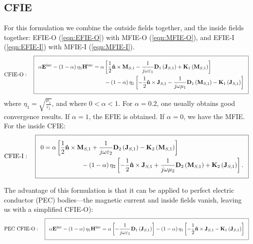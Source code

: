 \documentclass[a4paper,10pt]{book}
\newcommand{\field}[1]{\mathbf{#1}}
\newcommand{\current}[1]{\mathbf{#1}}
\newcommand{\vect}[1]{\mathbf{#1}}
\newcommand{\operator}[1]{\mathbf{#1}}
\begin{document}
\subsection{CFIE}
%
\par
For this formulation we combine the outside fields together, and the inside fields together: EFIE-O (\ref{eqn:EFIE-O}) with MFIE-O (\ref{eqn:MFIE-O}), and EFIE-I (\ref{eqn:EFIE-I}) with MFIE-I (\ref{eqn:MFIE-I}).
\begin{equation}\label{eqn:CFIE-O}
  \addtolength{\fboxsep}{5pt} 
 \text{CFIE-O}: \quad   \boxed{ 
   \begin{split} 
      \alpha \field{E}^\text{inc} - \left(1-\alpha \right) \eta_1\field{H}^\text{inc} &= \alpha \left[\frac{1}{2} \vect{\hat{n}} \times \current{M}_{S,1} - \frac{1}{j \omega \varepsilon_1} \operator{D}_1 \left( \current{J}_{S,1}\right) + \operator{K}_1 \left(\current{M}_{S,1}\right) \right]  \\ 
      & \qquad - \left(1-\alpha \right) \eta_1 \left[ - \frac{1}{2} \vect{\hat{n}} \times \current{J}_{S,1} - \frac{1}{j \omega \mu_1} \operator{D}_1 \left( \current{M}_{S,1}\right) - \operator{K}_1 \left(\current{J}_{S,1}\right) \right]
   \end{split} 
   } 
\end{equation}
where $\eta_1 = \sqrt{\frac{\mu_1}{\varepsilon_1}}$, and where $0<\alpha<1$. For $\alpha = 0.2$, one usually obtains good convergence results. If $\alpha = 1$, the EFIE is obtained. If $\alpha = 0$, we have the MFIE. For the inside CFIE:
\begin{equation}\label{eqn:CFIE-I}
  \addtolength{\fboxsep}{5pt} 
 \text{CFIE-I}: \quad   \boxed{ 
   \begin{split} 
      0 &= \alpha \left[\frac{1}{2} \vect{\hat{n}} \times \current{M}_{S,1} + \frac{1}{j \omega \varepsilon_2} \operator{D}_2\left(\current{J}_{S,1}\right) -  \operator{K}_2\left( \current{M}_{S,1}\right) \right] \\ &\qquad \qquad \qquad - \left(1-\alpha \right) \eta_2 \left[ - \frac{1}{2} \vect{\hat{n}} \times \current{J}_{S,1} + \frac{1}{j \omega \mu_2} \operator{D}_2\left(\current{M}_{S,1}\right) +  \operator{K}_2\left( \current{J}_{S,1}\right) \right].
   \end{split} 
   } 
\end{equation}
%
\par
The advantage of this formulation is that it can be applied to perfect electric conductor (PEC) bodies---the magnetic current and inside fields vanish, leaving us with a simplified CFIE-O):
\begin{equation}\label{eqn:CFIE-O-PEC}
  \addtolength{\fboxsep}{5pt} 
 \text{PEC CFIE-O}: \quad   \boxed{ 
      \alpha \field{E}^\text{inc} - \left(1-\alpha \right) \eta_1\field{H}^\text{inc} = \alpha \left[- \frac{1}{j \omega \varepsilon_1} \operator{D}_1 \left( \current{J}_{S,1}\right)\right]  - \left(1-\alpha \right) \eta_1 \left[ - \frac{1}{2} \vect{\hat{n}} \times \current{J}_{S,1} - \operator{K}_1 \left(\current{J}_{S,1}\right) \right]
   } 
\end{equation}
\end{document}

